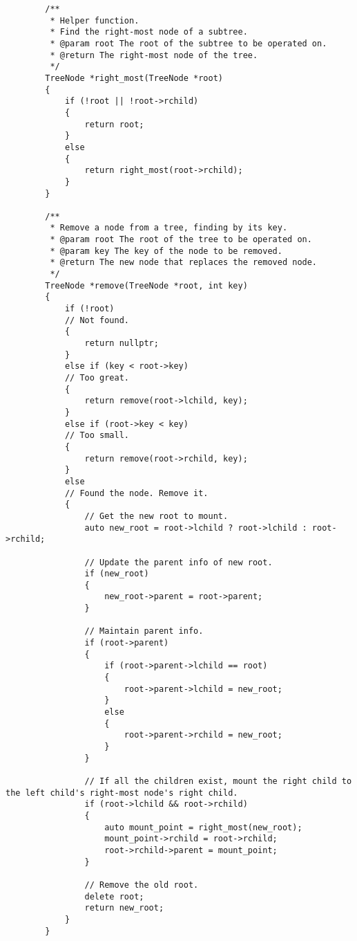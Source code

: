 \documentclass[11pt]{ctexrep}
\begin{document}
    \begin{verbatim}
        /**
         * Helper function.
         * Find the right-most node of a subtree.
         * @param root The root of the subtree to be operated on.
         * @return The right-most node of the tree.
         */
        TreeNode *right_most(TreeNode *root)
        {
            if (!root || !root->rchild)
            {
                return root;
            }
            else
            {
                return right_most(root->rchild);
            }
        }

        /**
         * Remove a node from a tree, finding by its key.
         * @param root The root of the tree to be operated on.
         * @param key The key of the node to be removed.
         * @return The new node that replaces the removed node.
         */
        TreeNode *remove(TreeNode *root, int key)
        {
            if (!root)
            // Not found.
            {
                return nullptr;
            }
            else if (key < root->key)
            // Too great.
            {
                return remove(root->lchild, key);
            }
            else if (root->key < key)
            // Too small.
            {
                return remove(root->rchild, key);
            }
            else
            // Found the node. Remove it.
            {
                // Get the new root to mount.
                auto new_root = root->lchild ? root->lchild : root->rchild;

                // Update the parent info of new root.
                if (new_root)
                {
                    new_root->parent = root->parent; 
                }

                // Maintain parent info.
                if (root->parent)
                {
                    if (root->parent->lchild == root)
                    {
                        root->parent->lchild = new_root;
                    }
                    else
                    {
                        root->parent->rchild = new_root;
                    }
                }

                // If all the children exist, mount the right child to the left child's right-most node's right child.
                if (root->lchild && root->rchild)
                {
                    auto mount_point = right_most(new_root);
                    mount_point->rchild = root->rchild;
                    root->rchild->parent = mount_point;
                }

                // Remove the old root.
                delete root;
                return new_root;
            }
        }
    \end{verbatim}
\end{document}
